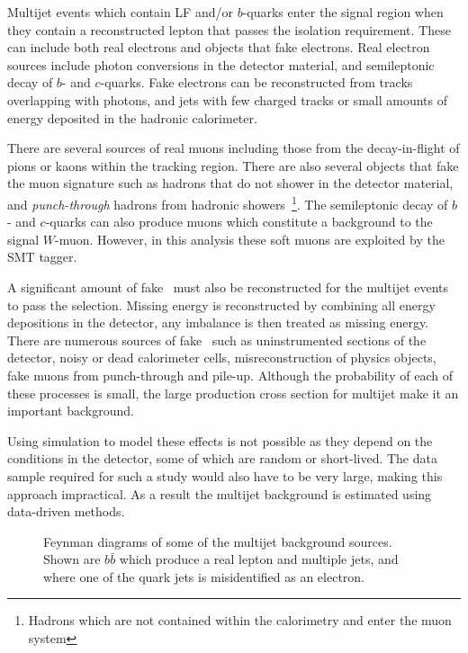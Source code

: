 Multijet events which contain LF and/or $b$-quarks enter the signal region when they contain a reconstructed lepton that passes the isolation requirement. These can include both real electrons and objects that fake electrons. Real electron sources include photon conversions in the detector material, and semileptonic decay of $b$- and $c$-quarks. Fake electrons can be reconstructed from tracks overlapping with photons, and jets with few charged tracks or small amounts of energy deposited in the hadronic calorimeter.

There are several sources of real muons including those from the decay-in-flight of pions or kaons within the tracking region. There are also several objects that fake the muon signature such as hadrons that do not shower in the detector material, and \emph{punch-through} hadrons from hadronic showers~\footnote{Hadrons which are not contained within the calorimetry and enter the muon system}. The semileptonic decay of $b$- and $c$-quarks can also produce muons which constitute a background to the signal $W$-muon. However, in this analysis these soft muons are exploited by the SMT tagger.

A significant amount of fake \met\ must also be reconstructed for the multijet events to pass the selection. Missing energy is reconstructed by combining all energy depositions in the detector, any imbalance is then treated as missing energy. There are numerous sources of fake \met\ such as uninstrumented sections of the detector, noisy or dead calorimeter cells, misreconstruction of physics objects, fake muons from punch-through and pile-up. Although the probability of each of these processes is small, the large production cross section for multijet make it an important background.

Using simulation to model these effects is not possible as they depend on the conditions in the detector, some of which are random or short-lived. The data sample required for such a study would also have to be very large, making this approach impractical. As a result the multijet background is estimated using data-driven methods.

\begin{figure}[htbp]
  \centering
    \begin{minipage}[][][t]{\textwidth}
      \centering
        
        \label{fig:MultiJetBkgReal}
    \end{minipage}
    
    \begin{minipage}[][][t]{\textwidth}
      \centering
        
        \label{fig:MultiJetBkgFake}
    \end{minipage}
    \caption[Feynman diagrams of some of the multijet background sources.]{Feynman diagrams of some of the multijet background sources. Shown are  $b\bar{b}$ which produce a real lepton and multiple jets, and  where one of the quark jets is misidentified as an electron.}\label{fig:MultiJetBkg}
\end{figure}

